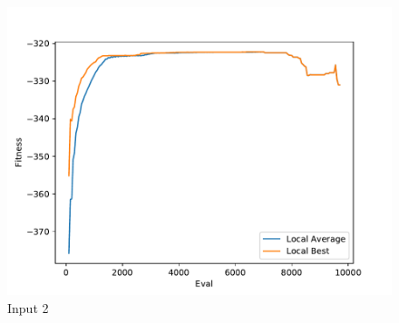 \documentclass{standalone}
\begin{document}
\begin{figure}[!htb]
	\caption{Input 2}
	\label{fig:graph_2055}
	\includegraphics[width=\textwidth]{../graphs/graphs/2055.pdf}
\end{figure}
\end{document}
